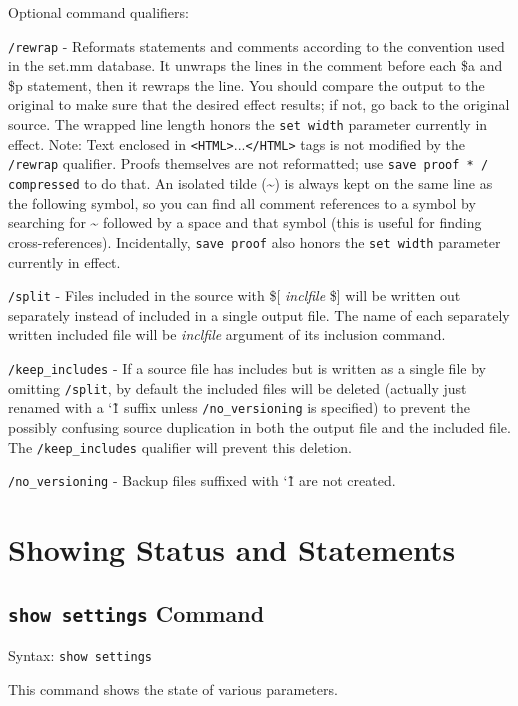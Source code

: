 Optional command qualifiers:

\texttt{/rewrap} -
Reformats statements and comments according to the
convention used in the set.mm database.
It unwraps the
lines in the comment before each \$a and \$p statement, then it
rewraps the line.  You should compare the output to the original
to make sure that the desired effect results; if not, go back to
the original source.  The wrapped line length honors the
\texttt{set width}
parameter currently in effect.  Note:  Text
enclosed in \texttt{<HTML>}...\texttt{</HTML>} tags is not modified by the
\texttt{/rewrap} qualifier.
Proofs themselves are not reformatted;
use \texttt{save proof * / compressed} to do that.
An isolated tilde (\~{}) is always kept on the same line as the following
symbol, so you can find all comment references to a symbol by
searching for \~{} followed by a space and that symbol
(this is useful for finding cross-references).
Incidentally, \texttt{save proof} also honors the \texttt{set width}
parameter currently in effect.

\texttt{/split} - Files included in the source with
\$[ \textit{inclfile} \$] will be
written out separately instead of included in a single output
file.  The name of each separately written included file will be
\textit{inclfile} argument of its inclusion command.

\texttt{/keep\_includes} - If a source file has includes but is written as a
single file by omitting \texttt{/split}, by default the included files will
be deleted (actually just renamed with a \char`\~1 suffix unless
\texttt{/no\_versioning} is specified) to prevent the possibly confusing
source duplication in both the output file and the included file.
The \texttt{/keep\_includes} qualifier will prevent this deletion.

\texttt{/no\_versioning} - Backup files suffixed with \char`\~1 are not created.


\section{Showing Status and Statements}



\subsection{\texttt{show settings} Command}
Syntax:  \texttt{show settings}

This command shows the state of various parameters.

